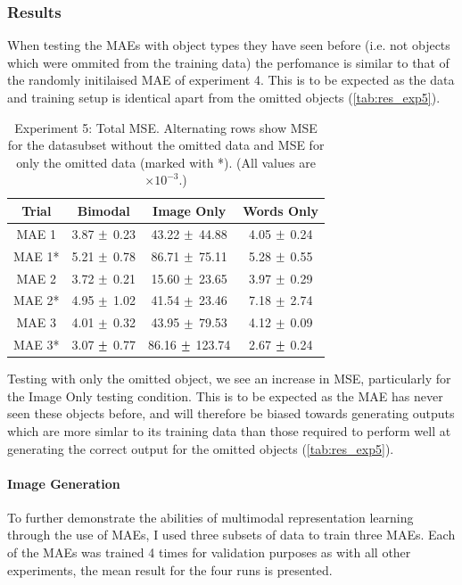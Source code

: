 \subsubsection{Results}

When testing the \acp{MAE} with object types they have seen before (i.e. not objects which were ommited from the training data) the perfomance is similar to that of the randomly initilaised \ac{MAE} of experiment 4. This is to be expected as the data and training setup is identical apart from the omitted objects (\autoref{tab:res_exp5}).
\begin{table}[h!]
\centering
	\begin{tabular}{|c|c|c|c|}
	\hline
\textbf{Trial} & 	\textbf{Bimodal} & 	\textbf{Image Only} 	& 	\textbf{Words Only} \\ \hline
MAE 1	&	3.87	$\mypm$	0.23	&	43.22	$\mypm$	44.88	&	4.05	$\mypm$	0.24	\\ \hline
MAE 1*	&	5.21	$\mypm$	0.78	&	86.71	$\mypm$	75.11	&	5.28	$\mypm$	0.55	\\ \hline
MAE 2	&	3.72	$\mypm$	0.21	&	15.60	$\mypm$	23.65	&	3.97	$\mypm$	0.29	\\ \hline
MAE 2*	&	4.95	$\mypm$	1.02	&	41.54	$\mypm$	23.46	&	7.18	$\mypm$	2.74	\\ \hline
MAE 3	&	4.01	$\mypm$	0.32	&	43.95	$\mypm$	79.53	&	4.12	$\mypm$	0.09	\\ \hline
MAE 3*	&	3.07	$\mypm$	0.77	&	86.16	$\mypm$	123.74	&	2.67	$\mypm$	0.24	\\ \hline
\end{tabular}
\caption{Experiment 5: Total MSE. Alternating rows show MSE for the datasubset without the omitted data and MSE for only the omitted data (marked with *). (All values are $\times10^{-3}$.)}
\label{tab:res_exp5}
\end{table}
Testing with only the omitted object, we see an increase in \ac{MSE}, particularly for the Image Only testing condition. This is to be expected as the MAE has never seen these objects before, and will therefore be biased towards generating outputs which are more simlar to its training data than those required to perform well at generating the correct output for the omitted objects (\autoref{tab:res_exp5}).

\paragraph{Image Generation}
To further demonstrate the abilities of multimodal representation learning through the use of \acp{MAE}, I used three subsets of data to train three \acp{MAE}. Each of the MAEs was trained 4 times for validation purposes as with all other experiments, the mean result for the four runs is presented.

